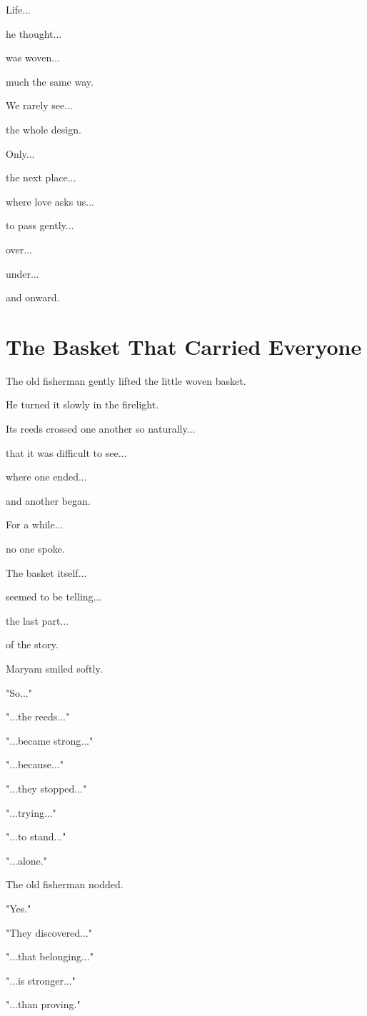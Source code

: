 \documentclass[12pt,openany]{book}
\begin{document}
Life...

he thought...

was woven...

much the same way.

We rarely see...

the whole design.

Only...

the next place...

where love asks us...

to pass gently...

over...

under...

and onward.
\section*{The Basket That Carried Everyone}

The old fisherman gently lifted the little woven basket.

He turned it slowly in the firelight.

Its reeds crossed one another so naturally...

that it was difficult to see...

where one ended...

and another began.

For a while...

no one spoke.

The basket itself...

seemed to be telling...

the last part...

of the story.

Maryam smiled softly.

"So..."

"...the reeds..."

"...became strong..."

"...because..."

"...they stopped..."

"...trying..."

"...to stand..."

"...alone."

The old fisherman nodded.

"Yes."

"They discovered..."

"...that belonging..."

"...is stronger..."

"...than proving."
\end{document}
